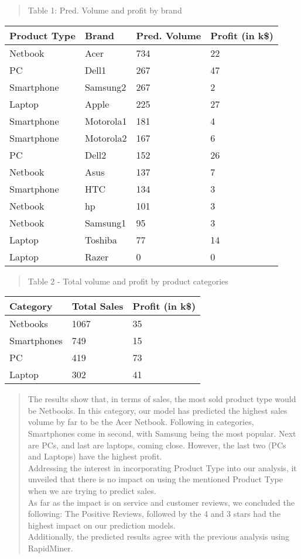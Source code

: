 \documentclass[]{article}
\begin{document}
\begin{quote}
Table 1: Pred. Volume and profit by brand
\end{quote}

\begin{longtable}[]{@{}llll@{}}
\toprule
Product Type & Brand & Pred. Volume & Profit (in k\$)\tabularnewline
\midrule
\endhead
Netbook & Acer & 734 & 22\tabularnewline
PC & Dell1 & 267 & 47\tabularnewline
Smartphone & Samsung2 & 267 & 2\tabularnewline
Laptop & Apple & 225 & 27\tabularnewline
Smartphone & Motorola1 & 181 & 4\tabularnewline
Smartphone & Motorola2 & 167 & 6\tabularnewline
PC & Dell2 & 152 & 26\tabularnewline
Netbook & Asus & 137 & 7\tabularnewline
Smartphone & HTC & 134 & 3\tabularnewline
Netbook & hp & 101 & 3\tabularnewline
Netbook & Samsung1 & 95 & 3\tabularnewline
Laptop & Toshiba & 77 & 14\tabularnewline
Laptop & Razer & 0 & 0\tabularnewline
\bottomrule
\end{longtable}

\begin{quote}
Table 2 - Total volume and profit by product categories
\end{quote}

\begin{longtable}[]{@{}lll@{}}
\toprule
Category & Total Sales & Profit (in k\$)\tabularnewline
\midrule
\endhead
Netbooks & 1067 & 35\tabularnewline
Smartphones & 749 & 15\tabularnewline
PC & 419 & 73\tabularnewline
Laptop & 302 & 41\tabularnewline
\bottomrule
\end{longtable}

\begin{quote}
The results show that, in terms of sales, the most sold product type
would be Netbooks. In this category, our model has predicted the highest
sales volume by far to be the Acer Netbook. Following in categories,
Smartphones come in second, with Samsung being the most popular. Next
are PCs, and last are laptops, coming close. However, the last two (PCs
and Laptops) have the highest profit.\\
Addressing the interest in incorporating Product Type into our analysis,
it unveiled that there is no impact on using the mentioned Product Type
when we are trying to predict sales.\\
As far as the impact is on service and customer reviews, we concluded
the following: The Positive Reviews, followed by the 4 and 3 stars had
the highest impact on our prediction models.\\
Additionally, the predicted results agree with the previous analysis
using RapidMiner.
\end{quote}
\end{document}
